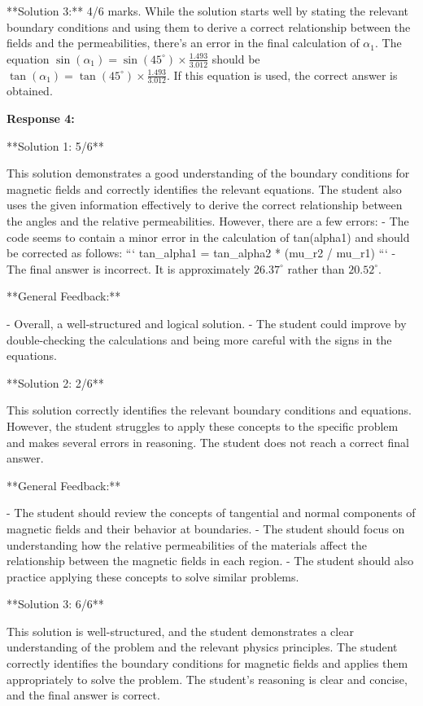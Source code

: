 \documentclass[a4paper,11pt]{article}
\begin{document}
**Solution 3:**
4/6 marks.
While the solution starts well by stating the relevant boundary conditions and using them to derive a correct relationship between the fields and the permeabilities, there's an error in the final calculation of \(\alpha_{1}\). The equation \( \sin(\alpha_{1}) = \sin(45^\circ) \times \frac{1.493}{3.012} \) should be \( \tan(\alpha_{1}) = \tan(45^\circ) \times \frac{1.493}{3.012} \). If this equation is used, the correct answer is obtained.

\bigskip    
\textbf{Response 4:}

**Solution 1: 5/6**

This solution demonstrates a good understanding of the boundary conditions for magnetic fields and correctly identifies the relevant equations. The student also uses the given information effectively to derive the correct relationship between the angles and the relative permeabilities. However, there are a few errors:
- The code seems to contain a minor error in the calculation of tan(alpha1) and should be corrected as follows:
```
tan_alpha1 = tan_alpha2 * (mu_r2 / mu_r1)
```
- The final answer is incorrect. It is approximately \(26.37^\circ\) rather than \(20.52^\circ\).

**General Feedback:**

- Overall, a well-structured and logical solution.
- The student could improve by double-checking the calculations and being more careful with the signs in the equations.

**Solution 2: 2/6**

This solution correctly identifies the relevant boundary conditions and equations. However, the student struggles to apply these concepts to the specific problem and makes several errors in reasoning. The student does not reach a correct final answer.

**General Feedback:**

- The student should review the concepts of tangential and normal components of magnetic fields and their behavior at boundaries.
- The student should focus on understanding how the relative permeabilities of the materials affect the relationship between the magnetic fields in each region.
- The student should also practice applying these concepts to solve similar problems.

**Solution 3: 6/6**

This solution is well-structured, and the student demonstrates a clear understanding of the problem and the relevant physics principles. The student correctly identifies the boundary conditions for magnetic fields and applies them appropriately to solve the problem. The student's reasoning is clear and concise, and the final answer is correct.
\end{document}
